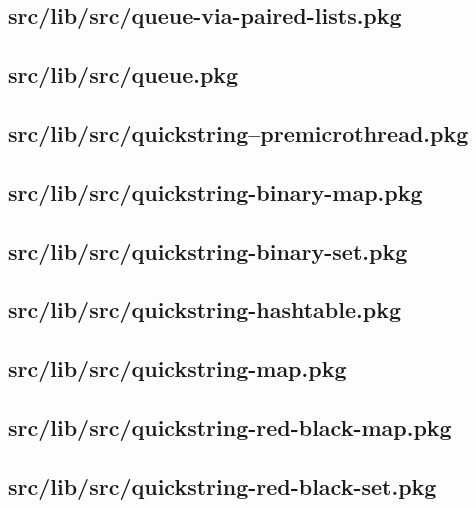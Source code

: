 \subsection{src/lib/src/queue-via-paired-lists.pkg}


\subsection{src/lib/src/queue.pkg}


\subsection{src/lib/src/quickstring--premicrothread.pkg}


\subsection{src/lib/src/quickstring-binary-map.pkg}


\subsection{src/lib/src/quickstring-binary-set.pkg}


\subsection{src/lib/src/quickstring-hashtable.pkg}


\subsection{src/lib/src/quickstring-map.pkg}


\subsection{src/lib/src/quickstring-red-black-map.pkg}


\subsection{src/lib/src/quickstring-red-black-set.pkg}



